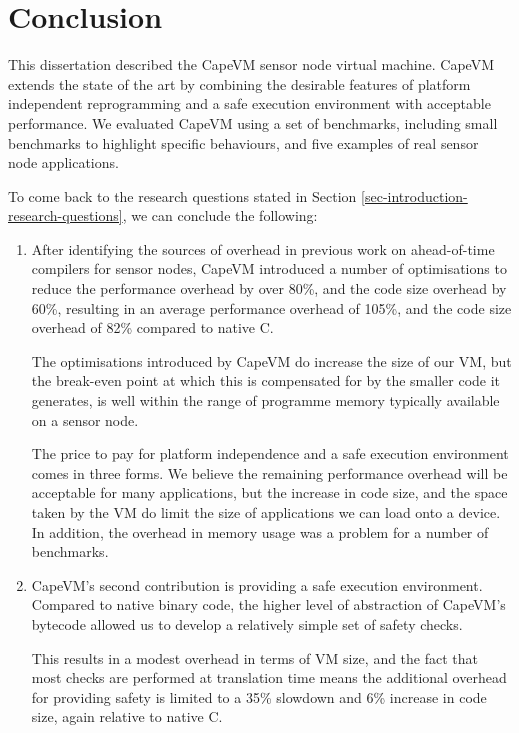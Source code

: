 \chapter{Conclusion}
This dissertation described the CapeVM sensor node virtual machine. CapeVM extends the state of the art by combining the desirable features of platform independent reprogramming and a safe execution environment with acceptable performance. We evaluated CapeVM using a set of benchmarks, including small benchmarks to highlight specific behaviours, and five examples of real sensor node applications.

To come back to the research questions stated in Section \ref{sec-introduction-research-questions}, we can conclude the following:

\begin{enumerate}
	\item
	After identifying the sources of overhead in previous work on ahead-of-time compilers for sensor nodes, CapeVM introduced a number of optimisations to reduce the performance overhead by over 80\%, and the code size overhead by 60\%, resulting in an average performance overhead of 105\%, and the code size overhead of 82\% compared to native C.

	The optimisations introduced by CapeVM do increase the size of our VM, but the break-even point at which this is compensated for by the smaller code it generates, is well within the range of programme memory typically available on a sensor node.

	The price to pay for platform independence and a safe execution environment comes in three forms. We believe the remaining performance overhead will be acceptable for many applications, but the increase in code size, and the space taken by the VM do limit the size of applications we can load onto a device. In addition, the overhead in memory usage was a problem for a number of benchmarks.

	\item
	CapeVM's second contribution is providing a safe execution environment. Compared to native binary code, the higher level of abstraction of CapeVM's bytecode allowed us to develop a relatively simple set of safety checks.
	
	This results in a modest overhead in terms of VM size, and the fact that most checks are performed at translation time means the additional overhead for providing safety is limited to a 35\% slowdown and 6\% increase in code size, again relative to native C.


\end{enumerate}
